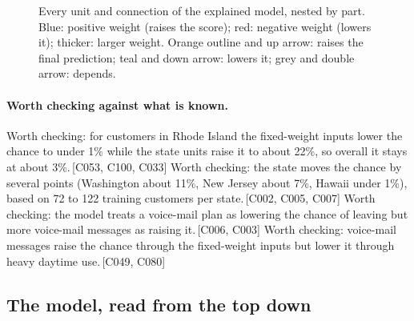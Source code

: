 \documentclass[a4paper,10pt]{article}
\newif\ifreviewmarks
\newcommand{\reviewrule}{\noindent{\color{BrickRed}\rule{\linewidth}{0.8pt}}}
\newenvironment{drafted}[1][]{%
  \ifreviewmarks\par\addvspace{\medskipamount}\reviewrule\par\nopagebreak
  \noindent{\color{BrickRed}\sffamily\footnotesize\textbf{Thesis Draft}\quad #1\hfill review}\par\nopagebreak\smallskip\fi}{%
  \ifreviewmarks\par\smallskip\noindent{\color{BrickRed}\sffamily\footnotesize end of thesis draft}\par\nopagebreak\reviewrule\par\medskip\fi}
\begin{document}
\begin{drafted}[plain-language layer: churn100-s4-c2]
\begin{landscape}
\begin{figure}[p]
{}%
\caption{Every unit and connection of the explained model, nested by part. Blue: positive weight (raises the score); red: negative weight (lowers it); thicker: larger weight. Orange outline and up arrow: raises the final prediction; teal and down arrow: lowers it; grey and double arrow: depends.}
\label{fig:churn100s4c2:overview}
\end{figure}
\end{landscape}
\paragraph{Worth checking against what is known.} Worth checking: for customers in Rhode Island the fixed-weight inputs lower the chance to under 1\% while the state units raise it to about 22\%, so overall it stays at about 3\%.\,{\scriptsize\textcolor{NavyBlue}{[C053, C100, C033]}} Worth checking: the state moves the chance by several points (Washington about 11\%, New Jersey about 7\%, Hawaii under 1\%), based on 72 to 122 training customers per state.\,{\scriptsize\textcolor{NavyBlue}{[C002, C005, C007]}} Worth checking: the model treats a voice-mail plan as lowering the chance of leaving but more voice-mail messages as raising it.\,{\scriptsize\textcolor{NavyBlue}{[C006, C003]}} Worth checking: voice-mail messages raise the chance through the fixed-weight inputs but lower it through heavy daytime use.\,{\scriptsize\textcolor{NavyBlue}{[C049, C080]}}
\subsection{The model, read from the top down}

\end{drafted}
\end{document}

